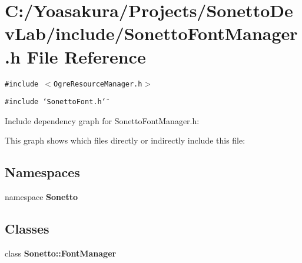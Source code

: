 \section{C:/Yoasakura/Projects/SonettoDevLab/include/SonettoFontManager.h File Reference}
\label{_sonetto_font_manager_8h}
{\tt \#include $<$OgreResourceManager.h$>$}\par
{\tt \#include \char`\"{}SonettoFont.h\char`\"{}}\par


Include dependency graph for SonettoFontManager.h:

This graph shows which files directly or indirectly include this file:\subsection*{Namespaces}
\begin{CompactItemize}
\item 
namespace {\bf Sonetto}
\end{CompactItemize}
\subsection*{Classes}
\begin{CompactItemize}
\item 
class {\bf Sonetto::FontManager}
\end{CompactItemize}
